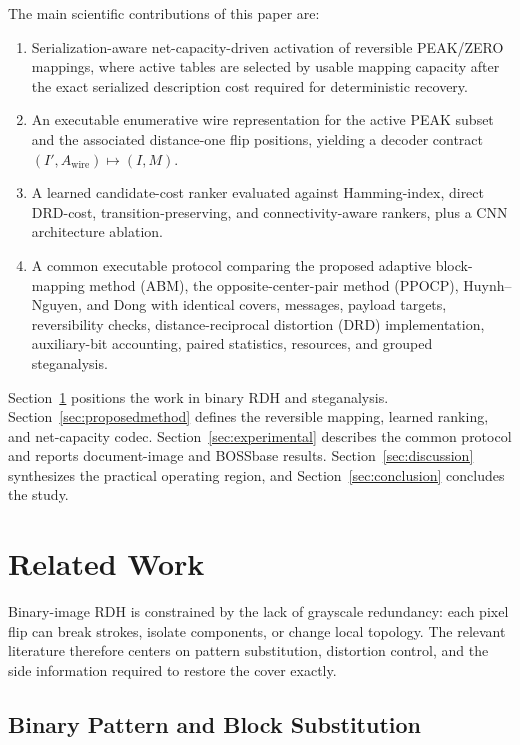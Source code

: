 \documentclass[a4paper,fleqn]{cas-dc}
\newcommand{\RevisionAddBegin}{\begingroup\color{revisionblue}}
\newcommand{\RevisionAddEnd}{\endgroup}
\begin{document}
The main scientific contributions of this paper are:
\begin{enumerate}
\RevisionAddBegin
    \item Serialization-aware net-capacity-driven activation of reversible
    PEAK/ZERO mappings, where active tables are selected by usable mapping capacity
    after the exact serialized description cost required for deterministic
    recovery.
    \item An executable enumerative wire representation for the active PEAK
    subset and the associated distance-one flip positions, yielding a decoder
    contract $(I',A_{\mathrm{wire}})\mapsto(I,M)$.
    \item A learned candidate-cost ranker evaluated against Hamming-index,
    direct DRD-cost, transition-preserving, and connectivity-aware rankers, plus
    a CNN architecture ablation.
    \item A common executable protocol comparing the proposed adaptive
    block-mapping method (ABM), the opposite-center-pair method (PPOCP),
    Huynh--Nguyen, and Dong with identical
    covers, messages, payload targets, reversibility checks,
    distance-reciprocal distortion (DRD) implementation, auxiliary-bit
    accounting, paired statistics, resources, and grouped steganalysis.
\RevisionAddEnd
\end{enumerate}

Section~\ref{sec:relatedwork} positions the work in binary RDH and
steganalysis. Section~\ref{sec:proposedmethod} defines the reversible mapping,
learned ranking, and net-capacity codec. Section~\ref{sec:experimental}
describes the common protocol and reports document-image and BOSSbase results.
Section~\ref{sec:discussion} synthesizes the practical operating region, and
Section~\ref{sec:conclusion} concludes the study.


\section{Related Work}
\label{sec:relatedwork}

\RevisionAddBegin
Binary-image RDH is constrained by the lack of grayscale redundancy: each
pixel flip can break strokes, isolate components, or change local topology.
The relevant literature therefore centers on pattern substitution, distortion
control, and the side information required to restore the cover exactly.
\RevisionAddEnd

\RevisionAddBegin
\subsection{Binary Pattern and Block Substitution}
\RevisionAddEnd
\end{document}
